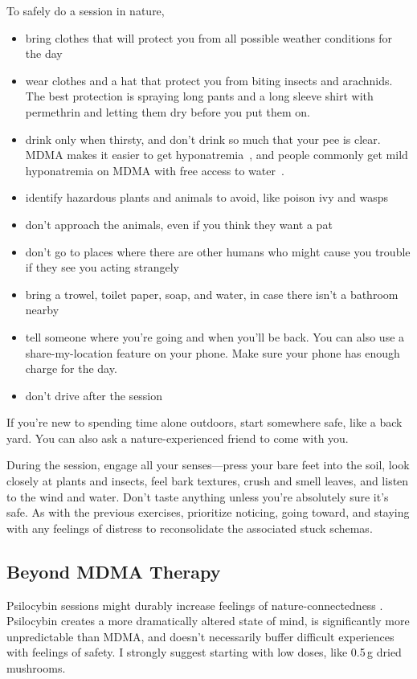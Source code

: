 \documentclass[11pt,oneside]{book}
\let\cite\parencite
\begin{document}
To safely do a session in nature,
\begin{itemize}
    \item bring clothes that will protect you from all possible weather conditions for the day
    \item wear clothes and a hat that protect you from biting insects and arachnids. The best protection is spraying long pants and a long sleeve shirt with permethrin and letting them dry before you put them on.
    \item drink only when thirsty, and don't drink so much that your pee is clear. MDMA makes it easier to get hyponatremia~\cite{baggottWater}, and people commonly get mild hyponatremia on MDMA with free access to water~\cite{atilaHyponatremia}.
    \item identify hazardous plants and animals to avoid, like poison ivy and wasps
    \item don't approach the animals, even if you think they want a pat
    \item don't go to places where there are other humans who might cause you trouble if they see you acting strangely
    \item bring a trowel, toilet paper, soap, and water, in case there isn't a bathroom nearby
    \item tell someone where you're going and when you'll be back. You can also use a share-my-location feature on your phone. Make sure your phone has enough charge for the day.
    \item don't drive after the session
\end{itemize}

If you're new to spending time alone outdoors, start somewhere safe, like a back yard. You can also ask a nature-experienced friend to come with you.

During the session, engage all your senses---press your bare feet into the soil, look closely at plants and insects, feel bark textures, crush and smell leaves, and listen to the wind and water. Don't taste anything unless you're absolutely sure it's safe. As with the previous exercises, prioritize noticing, going toward, and staying with any feelings of distress to reconsolidate the associated stuck schemas.

\subsection*{Beyond MDMA Therapy}
Psilocybin sessions might durably increase feelings of nature-connectedness \cite{forstmannPsilocybinNature}. Psilocybin creates a more dramatically altered state of mind, is significantly more unpredictable than MDMA, and doesn't necessarily buffer difficult experiences with feelings of safety. I strongly suggest starting with low doses, like 0.5\,g dried mushrooms.
\end{document}
